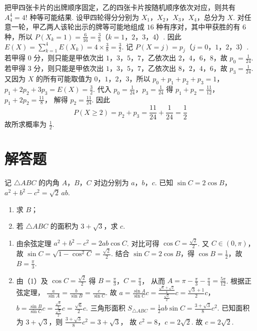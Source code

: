 \begin{solution}
把甲四张卡片的出牌顺序固定，乙的四张卡片按随机顺序依次对应，则共有 \(A_4^4=4!\) 种等可能结果.
设甲四轮得分分别为 \(X_1\)，\(X_2\)，\(X_3\)，\(X_4\)，总分为 \(X\). 对任意一轮，甲乙两人该轮出示的牌等可能地组成 \(16\) 种有序对，其中甲获胜的有 \(6\) 种，所以
\(P(X_k=1)=\frac{6}{16}=\frac38\)（\(k=1\)，\(2\)，\(3\)，\(4\)）.
因此
\(E(X)=\sum_{k=1}^4 E(X_k)=4\times\frac38=\frac32\).
记 \(P(X=j)=p_j\)（\(j=0\)，\(1\)，\(2\)，\(3\)）. 若甲得 \(0\) 分，则只能是甲依次出 \(1\)，\(3\)，\(5\)，\(7\)，乙依次出 \(2\)，\(4\)，\(6\)，\(8\)，故
\(p_0=\frac1{24}\).
若甲得 \(3\) 分，则只能是甲依次出 \(1\)，\(3\)，\(5\)，\(7\)，乙依次出 \(8\)，\(2\)，\(4\)，\(6\)，故
\(p_3=\frac1{24}\).
又因为 \(X\) 的所有可能取值为 \(0\)，\(1\)，\(2\)，\(3\)，所以
\(p_0+p_1+p_2+p_3=1\)，
\(p_1+2p_2+3p_3=E(X)=\frac32\).
代入 \(p_0=\frac1{24}\)，\(p_3=\frac1{24}\) 得
\(p_1+p_2=\frac{11}{12}\)，\(p_1+2p_2=\frac{11}{8}\)，
解得
\(p_2=\frac{11}{24}\).
因此
\[
P(X\ge2)=p_2+p_3=\frac{11}{24}+\frac1{24}=\frac12
\]
故所求概率为 \(\frac12\).
\end{solution}
\section{解答题}

\begin{problem}
记 \(\triangle ABC\) 的内角 \(A\)，\(B\)，\(C\) 对边分别为 \(a\)，\(b\)，\(c\). 已知
\(\sin C =2\cos B\)，\(a^2+b^2-c^2=\sqrt2\,ab\).
\begin{enumerate}
\item 求 \(B\)；
\item 若 \(\triangle ABC\) 的面积为 \(3+\sqrt3\)，求 \(c\).
\end{enumerate}
\end{problem}

\begin{solution}
\begin{enumerate}
\item 由余弦定理
\(a^2+b^2-c^2=2ab\cos C\).
对比可得
\(\cos C=\frac{\sqrt2}{2}\).
又 \(C\in(0,\pi)\)，故
\(\sin C=\sqrt{1-\cos^2C}=\frac{\sqrt2}{2}\).
结合 \(\sin C=2\cos B\)，得 \(\cos B=\frac12\)，故
\(B=\frac\pi3\).

\item 由（1）及 \(\cos C=\frac{\sqrt2}{2}\) 得
\(B=\frac\pi3\)，\(C=\frac\pi4\)，
从而
\(A=\pi-\frac\pi3-\frac\pi4=\frac{5\pi}{12}\).
根据正弦定理，
\(\frac{a}{\sin A}=\frac{b}{\sin B}=\frac{c}{\sin C}\).
故
\(a=\frac{\sin A}{\sin C}c=\frac{\frac{\sqrt6+\sqrt2}{4}}{\frac{\sqrt2}{2}}c=\frac{\sqrt3+1}{2}c\)，\(b=\frac{\sin B}{\sin C}c=\frac{\frac{\sqrt3}{2}}{\frac{\sqrt2}{2}}c=\frac{\sqrt6}{2}c\).
三角形面积
\(S_{\triangle ABC}=\frac12 ab\sin C=\frac{3+\sqrt3}{8}c^2\).
已知面积为 \(3+\sqrt3\)，则
\(\frac{3+\sqrt3}{8}c^2=3+\sqrt3\)，
故
\(c^2=8\)，\(c=2\sqrt2\).
故 \(c=2\sqrt2\).
\end{enumerate}
\end{solution}

